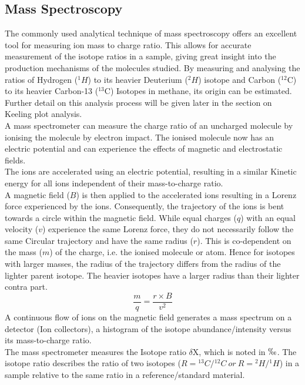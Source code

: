 \subsection{Mass Spectroscopy}
The commonly used analytical technique of mass spectroscopy offers an excellent tool for measuring ion mass to charge ratio. This allows for accurate measurement of the isotope ratios in a sample, giving great insight into the production mechanisms of the molecules studied. By measuring and analysing the ratios of Hydrogen ($^{1}H$) to its heavier Deuterium ($^{2}H$) isotope and Carbon ($^{12}$C) to its heavier Carbon-13 ($^{13}$C) Isotopes in methane, its origin can be estimated. Further detail on this analysis process will be given later in the section on Keeling plot analysis.\\
A mass spectrometer can measure the charge ratio of an uncharged molecule by ionising the molecule by electron impact. The ionised molecule now has an electric potential and can experience the effects of magnetic and electrostatic fields.\\
The ions are accelerated using an electric potential, resulting in a similar Kinetic energy for all ions independent of their mass-to-charge ratio.\\
A magnetic field ($B$) is then applied to the accelerated ions resulting in a Lorenz force experienced by the ions. Consequently, the trajectory of the ions is bent towards a circle within the magnetic field. While equal charges ($q$) with an equal velocity ($v$) experience the same Lorenz force, they do not necessarily follow the same Circular trajectory and have the same radius ($r$). This is co-dependent on the mass ($m$) of the charge, i.e. the ionised molecule or atom. Hence for isotopes with larger masses, the radius of the trajectory differs from the radius of the lighter parent isotope. The heavier isotopes have a larger radius than their lighter contra part.
\begin{equation}
\frac{m}{q} = \frac{r \times B}{v^2}
\end{equation}
A continuous flow of ions on the magnetic field generates a mass spectrum on a detector (Ion collectors), a histogram of the isotope abundance/intensity versus its mass-to-charge ratio.\\
The mass spectrometer measures the Isotope ratio $\delta$X, which is noted in $\permil$. The isotope ratio describes the ratio of two isotopes ($R = {^{13}C}/{^{12}C} \ or \ R = {^{2}H}/{^{1}H}$) in a sample relative to the same ratio in a reference/standard material. 
